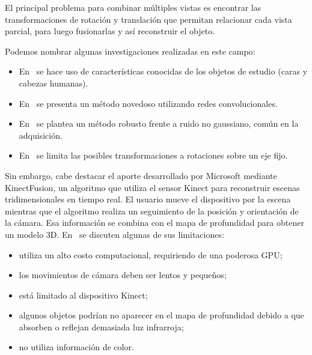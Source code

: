 	El principal problema para combinar múltiples vistas es
	encontrar las transformaciones de rotación y translación que permitan
	relacionar cada vista parcial, para luego fusionarlas y así reconstruir el objeto.

	Podemos nombrar algunas investigaciones realizadas en este campo:
	\begin{itemize}
		\item En~\cite{Hassanpour} %
	se hace uso de características conocidas de los objetos de estudio (caras y cabezas humanas).
		\item En~\cite{Riegler2017THREEDV} %
	se presenta un método novedoso utilizando redes convolucionales.
		\item En~\cite{Zach08fastand} %
	se plantea un método robusto frente a ruido no gaussiano, común en la adquisición.
		\item En~\cite{automatic-3d-model-construction-for-turn-table-sequences} %
	se limita las posibles transformaciones a rotaciones sobre un eje fijo.
	\end{itemize}

	Sin embargo, cabe destacar el aporte desarrollado por Microsoft mediante
	KinectFusion, un algoritmo que utiliza el sensor Kinect para reconstruir escenas tridimensionales en tiempo real.
	El usuario mueve el dispositivo por la escena mientras que el algoritmo realiza un seguimiento de la posición y orientación de la cámara. Esa información se combina con el mapa de profundidad para obtener un modelo 3D.
	En~\cite{real-time-3d-reconstruction-using-a-kinect-sensor} %
	se discuten algunas de sus limitaciones:
	\begin{itemize}
		\item utiliza un alto costo computacional, requiriendo de una poderosa GPU;
		\item los movimientos de cámara deben ser lentos y pequeños;
		\item está limitado al dispositivo Kinect;
		\item algunos objetos podrían no aparecer en el mapa de profundidad debido a que absorben o reflejan demasiada luz infrarroja;
		\item no utiliza información de color.
	\end{itemize}

